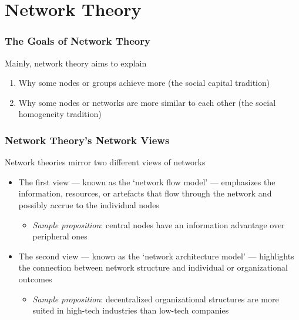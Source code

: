 \documentclass[notes, aspectratio=1610]{beamer}
\begin{document}
\section{Network Theory}

\begin{frame}
	\frametitle{The Goals of Network Theory}
	Mainly, network theory aims to explain

	\begin{enumerate}
		\item Why some nodes or groups achieve more (the 
		social capital tradition)
		\item Why some nodes or  networks  are  more  similar  to  
		each  other  (the  social   homogeneity   tradition)
	\end{enumerate}
	
\end{frame}

\begin{frame}
	\frametitle{Network Theory's Network Views}

	Network theories mirror two different views of networks

	\begin{itemize}
		\item The first view --- known as the `network flow model' 
		--- emphasizes the information, resources, or artefacts 
		that flow through the network and possibly accrue to 
		the individual nodes
		\begin{itemize}
			\item \textit{Sample proposition}: central nodes have an information advantage
			over peripheral ones
		\end{itemize}
		\item The second view --- known as the `network architecture 
		model' --- highlights the connection between network structure 
		and individual or organizational outcomes  
		\begin{itemize}
			\item \textit{Sample proposition}: decentralized organizational 
			structures are more suited in high-tech industries than
			low-tech companies
		\end{itemize}
	\end{itemize}
\end{frame}
\end{document}
